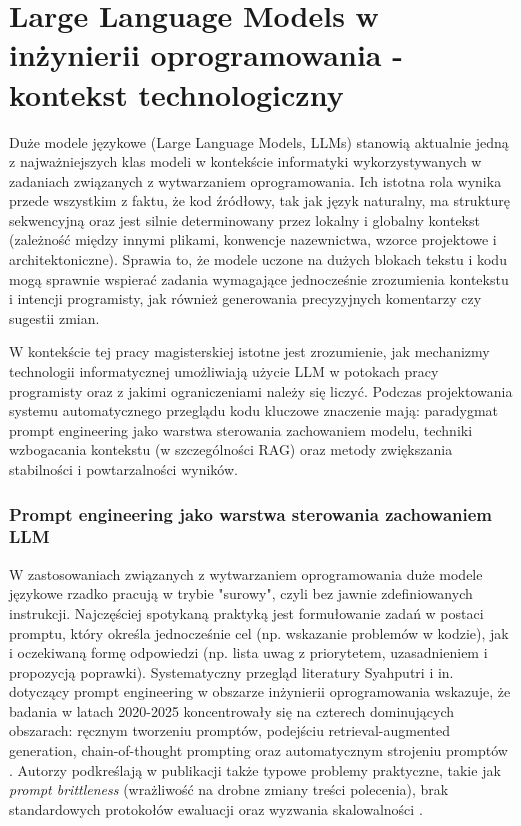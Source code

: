 \section{Large Language Models w inżynierii oprogramowania - kontekst technologiczny}
\label{subsec:llm-kontekst-technologiczny}

Duże modele językowe (Large Language Models, LLMs) stanowią aktualnie jedną z najważniejszych klas modeli w kontekście
informatyki wykorzystywanych w zadaniach związanych z wytwarzaniem oprogramowania. Ich istotna rola wynika przede wszystkim
z faktu, że kod źródłowy, tak jak język naturalny, ma strukturę sekwencyjną oraz jest silnie determinowany przez lokalny i globalny
kontekst (zależność między innymi plikami, konwencje nazewnictwa, wzorce projektowe i architektoniczne).
Sprawia to, że modele uczone na dużych blokach tekstu i kodu mogą sprawnie wspierać zadania wymagające
jednocześnie zrozumienia kontekstu i intencji programisty, jak również generowania precyzyjnych komentarzy czy sugestii zmian.

W kontekście tej pracy magisterskiej istotne jest zrozumienie, jak mechanizmy technologii informatycznej umożliwiają użycie LLM w potokach
pracy programisty oraz z jakimi ograniczeniami należy się liczyć. Podczas projektowania systemu automatycznego
przeglądu kodu kluczowe znaczenie mają: paradygmat prompt engineering jako warstwa sterowania zachowaniem modelu,
techniki wzbogacania kontekstu (w szczególności RAG) oraz metody zwiększania stabilności i powtarzalności wyników.

\subsubsection{Prompt engineering jako warstwa sterowania zachowaniem LLM}
W zastosowaniach związanych z wytwarzaniem oprogramowania duże modele językowe rzadko pracują w trybie "surowy", czyli
bez jawnie zdefiniowanych instrukcji. Najczęściej spotykaną praktyką jest formułowanie zadań w postaci promptu,
który określa jednocześnie cel (np. wskazanie problemów w kodzie), jak i oczekiwaną  formę odpowiedzi (np. lista uwag z
priorytetem, uzasadnieniem i propozycją poprawki). Systematyczny przegląd literatury Syahputri i in. dotyczący prompt
engineering w obszarze inżynierii oprogramowania wskazuje, że badania w latach 2020-2025 koncentrowały się na czterech
dominujących obszarach: ręcznym tworzeniu promptów, podejściu retrieval-augmented generation, chain-of-thought prompting
oraz automatycznym strojeniu promptów \cite{syahputri2025prompt}. Autorzy podkreślają w publikacji także typowe problemy
praktyczne, takie jak \emph{prompt brittleness} (wrażliwość na drobne zmiany treści polecenia), brak standardowych
protokołów ewaluacji oraz wyzwania skalowalności \cite{syahputri2025prompt}.

